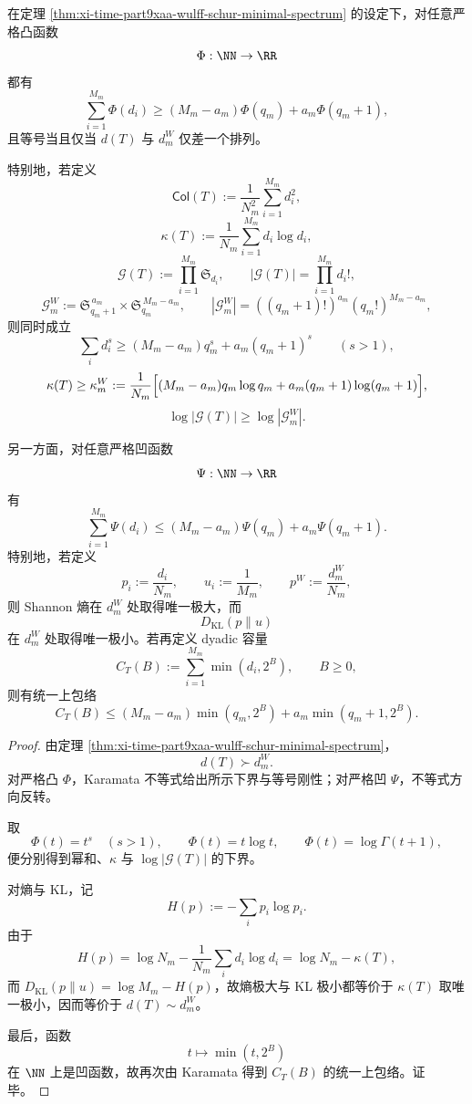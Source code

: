 \begin{corollary}\label{cor:xi-time-part9xaa-wulff-universal-convex-envelope}
在定理 \ref{thm:xi-time-part9xaa-wulff-schur-minimal-spectrum} 的设定下，对任意严格凸函数
\[
\Phi:\NN\to\RR
\]
都有
\[
\sum_{i=1}^{M_m}\Phi(d_i)\ge (M_m-a_m)\Phi(q_m)+a_m\Phi(q_m+1),
\]
且等号当且仅当 \(d(T)\) 与 \(d_m^{W}\) 仅差一个排列。

特别地，若定义
\[
\mathsf{Col}(T):=\frac{1}{N_m^2}\sum_{i=1}^{M_m}d_i^2,
\]
\[
\kappa(T):=\frac1{N_m}\sum_{i=1}^{M_m}d_i\log d_i,
\]
\[
\mathcal G(T):=\prod_{i=1}^{M_m}\mathfrak S_{d_i},
\qquad
|\mathcal G(T)|=\prod_{i=1}^{M_m}d_i!,
\]
\[
\mathcal G_m^{W}:=\mathfrak S_{q_m+1}^{\,a_m}\times \mathfrak S_{q_m}^{\,M_m-a_m},
\qquad
|\mathcal G_m^{W}|=((q_m+1)!)^{a_m}(q_m!)^{M_m-a_m},
\]
则同时成立
\[
\sum_i d_i^s\ge (M_m-a_m)q_m^s+a_m(q_m+1)^s
\qquad (s>1),
\]
\[
\kappa(T)\ge \kappa_m^{W}
:=
\frac1{N_m}\Bigl[(M_m-a_m)q_m\log q_m+a_m(q_m+1)\log(q_m+1)\Bigr],
\]
\[
\log|\mathcal G(T)|\ge \log|\mathcal G_m^{W}|.
\]

另一方面，对任意严格凹函数
\[
\Psi:\NN\to\RR
\]
有
\[
\sum_{i=1}^{M_m}\Psi(d_i)\le (M_m-a_m)\Psi(q_m)+a_m\Psi(q_m+1).
\]
特别地，若定义
\[
p_i:=\frac{d_i}{N_m},
\qquad
u_i:=\frac1{M_m},
\qquad
p^{W}:=\frac{d_m^{W}}{N_m},
\]
则 Shannon 熵在 \(d_m^{W}\) 处取得唯一极大，而
\[
D_{\mathrm{KL}}(p\|u)
\]
在 \(d_m^{W}\) 处取得唯一极小。若再定义 dyadic 容量
\[
C_T(B):=\sum_{i=1}^{M_m}\min(d_i,2^B),
\qquad B\ge 0,
\]
则有统一上包络
\[
C_T(B)\le (M_m-a_m)\min(q_m,2^B)+a_m\min(q_m+1,2^B).
\]
\end{corollary}
\begin{proof}
由定理 \ref{thm:xi-time-part9xaa-wulff-schur-minimal-spectrum}，
\[
d(T)\succ d_m^{W}.
\]
对严格凸 \(\Phi\)，Karamata 不等式给出所示下界与等号刚性；对严格凹 \(\Psi\)，不等式方向反转。

取
\[
\Phi(t)=t^s\quad (s>1),
\qquad
\Phi(t)=t\log t,
\qquad
\Phi(t)=\log\Gamma(t+1),
\]
便分别得到幂和、\(\kappa\) 与 \(\log|\mathcal G(T)|\) 的下界。

对熵与 KL，记
\[
H(p):=-\sum_i p_i\log p_i.
\]
由于
\[
H(p)=\log N_m-\frac1{N_m}\sum_i d_i\log d_i
=
\log N_m-\kappa(T),
\]
而 \(D_{\mathrm{KL}}(p\|u)=\log M_m-H(p)\)，故熵极大与 KL 极小都等价于 \(\kappa(T)\) 取唯一极小，因而等价于 \(d(T)\sim d_m^{W}\)。

最后，函数
\[
t\longmapsto \min(t,2^B)
\]
在 \(\NN\) 上是凹函数，故再次由 Karamata 得到 \(C_T(B)\) 的统一上包络。证毕。
\end{proof}

